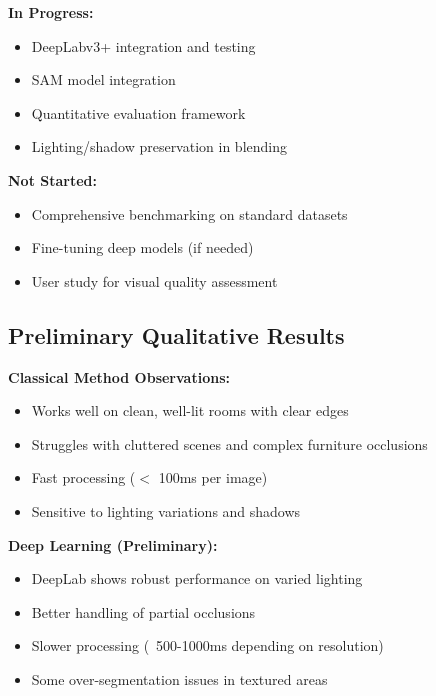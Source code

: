 \documentclass[11pt]{article}
\begin{document}
\textbf{In Progress:}
\begin{itemize}
    \item DeepLabv3+ integration and testing
    \item SAM model integration
    \item Quantitative evaluation framework
    \item Lighting/shadow preservation in blending
\end{itemize}

\textbf{Not Started:}
\begin{itemize}
    \item Comprehensive benchmarking on standard datasets
    \item Fine-tuning deep models (if needed)
    \item User study for visual quality assessment
\end{itemize}

\subsection{Preliminary Qualitative Results}


\textbf{Classical Method Observations:}
\begin{itemize}
    \item Works well on clean, well-lit rooms with clear edges
    \item Struggles with cluttered scenes and complex furniture occlusions
    \item Fast processing ($<$ 100ms per image)
    \item Sensitive to lighting variations and shadows
\end{itemize}

\textbf{Deep Learning (Preliminary):}
\begin{itemize}
    \item DeepLab shows robust performance on varied lighting
    \item Better handling of partial occlusions
    \item Slower processing (~500-1000ms depending on resolution)
    \item Some over-segmentation issues in textured areas
\end{itemize}
\end{document}
